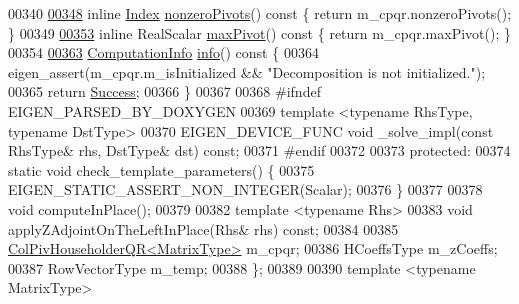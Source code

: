 \begin{DoxyCode}
00340 
\hyperlink{group___q_r___module_af9d7a5bdbc16a4a0bf7394ef0dd208da}{00348}   \textcolor{keyword}{inline} \hyperlink{namespace_eigen_a62e77e0933482dafde8fe197d9a2cfde}{Index} \hyperlink{group___q_r___module_af9d7a5bdbc16a4a0bf7394ef0dd208da}{nonzeroPivots}()\textcolor{keyword}{ const }\{ \textcolor{keywordflow}{return} m\_cpqr.nonzeroPivots(); \}
00349 
\hyperlink{group___q_r___module_a5b712a58c13b7e5089be9228ec42f738}{00353}   \textcolor{keyword}{inline} RealScalar \hyperlink{group___q_r___module_a5b712a58c13b7e5089be9228ec42f738}{maxPivot}()\textcolor{keyword}{ const }\{ \textcolor{keywordflow}{return} m\_cpqr.maxPivot(); \}
00354 
\hyperlink{group___q_r___module_a1f5c45f78848cfdbb96963cefbbb3274}{00363}   \hyperlink{group__enums_ga85fad7b87587764e5cf6b513a9e0ee5e}{ComputationInfo} \hyperlink{group___q_r___module_a1f5c45f78848cfdbb96963cefbbb3274}{info}()\textcolor{keyword}{ const }\{
00364     eigen\_assert(m\_cpqr.m\_isInitialized && \textcolor{stringliteral}{"Decomposition is not initialized."});
00365     \textcolor{keywordflow}{return} \hyperlink{group__enums_gga85fad7b87587764e5cf6b513a9e0ee5ea52581b035f4b59c203b8ff999ef5fcea}{Success};
00366   \}
00367 
00368 \textcolor{preprocessor}{#ifndef EIGEN\_PARSED\_BY\_DOXYGEN}
00369   \textcolor{keyword}{template} <\textcolor{keyword}{typename} RhsType, \textcolor{keyword}{typename} DstType>
00370   EIGEN\_DEVICE\_FUNC \textcolor{keywordtype}{void} \_solve\_impl(\textcolor{keyword}{const} RhsType& rhs, DstType& dst) \textcolor{keyword}{const};
00371 \textcolor{preprocessor}{#endif}
00372 
00373  \textcolor{keyword}{protected}:
00374   \textcolor{keyword}{static} \textcolor{keywordtype}{void} check\_template\_parameters() \{
00375     EIGEN\_STATIC\_ASSERT\_NON\_INTEGER(Scalar);
00376   \}
00377 
00378   \textcolor{keywordtype}{void} computeInPlace();
00379 
00382   \textcolor{keyword}{template} <\textcolor{keyword}{typename} Rhs>
00383   \textcolor{keywordtype}{void} applyZAdjointOnTheLeftInPlace(Rhs& rhs) \textcolor{keyword}{const};
00384 
00385   \hyperlink{group___q_r___module}{ColPivHouseholderQR<MatrixType>} m\_cpqr;
00386   HCoeffsType m\_zCoeffs;
00387   RowVectorType m\_temp;
00388 \};
00389 
00390 \textcolor{keyword}{template} <\textcolor{keyword}{typename} MatrixType>

\end{DoxyCode}
